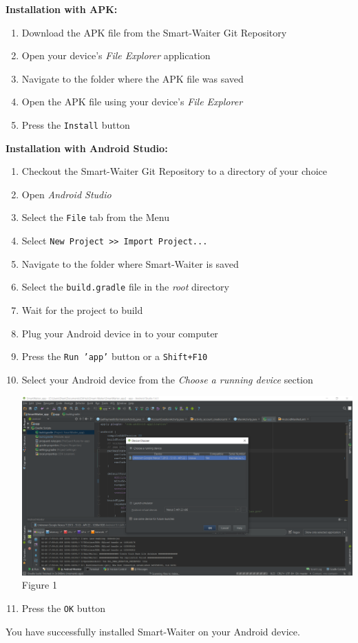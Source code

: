 \documentclass[12pt, titlepage]{article}
\begin{document}
\textbf{\newline Installation with APK:}
	\begin{enumerate}
		\item Download the APK file from the Smart-Waiter Git Repository
		\item Open your device's \emph{File Explorer} application
		\item Navigate to the folder where the APK file was saved
		\item Open the APK file using your device's \emph{File Explorer}
		\item Press the \texttt{Install} button
	\end{enumerate}

\textbf{\newline Installation with Android Studio:}
	\begin{enumerate}
		\item Checkout the Smart-Waiter Git Repository to a directory of 				your choice
		\item Open \emph{Android Studio}
		\item Select the \texttt{File} tab from the Menu
		\item Select \texttt{New Project >> Import Project...}
		\item Navigate to the folder where Smart-Waiter is saved
		\item Select the \texttt{build.gradle} file in the \emph{root} 					directory
		\item Wait for the project to build
		\item Plug your Android device in to your computer 
		\item Press the \texttt{Run 'app'} button or a \texttt{Shift+F10}
		\item Select your Android device from the \emph{Choose a running device} section
		\begin{center}
			\includegraphics[width=1.0\textwidth]{android-studio.png}
			\linebreak Figure 1 %
		\end{center}
		\item Press the \texttt{OK} button		
	\end{enumerate}
You have successfully installed Smart-Waiter on your Android device.
\end{document}
